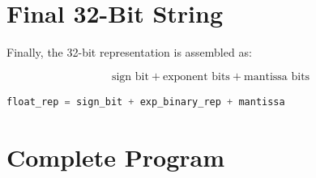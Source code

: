 \documentclass[11pt]{article}
\begin{document}
\section{Final 32-Bit String}

Finally, the 32-bit representation is assembled as:

\[
\text{sign bit} + \text{exponent bits} + \text{mantissa bits}
\]

\begin{lstlisting}[language=Python]
float_rep = sign_bit + exp_binary_rep + mantissa
\end{lstlisting}

\section{Complete Program}
\end{document}
